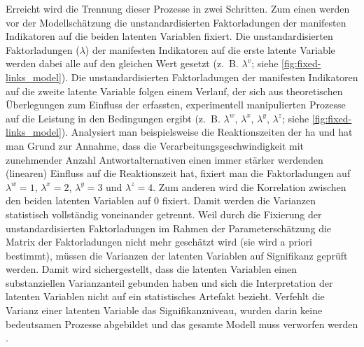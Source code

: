 \documentclass[11pt, twoside, a4paper]{book}		%
\begin{document}
Erreicht wird die Trennung dieser Prozesse in zwei Schritten. Zum einen werden vor der Modellschätzung die unstandardisierten Faktorladungen der manifesten Indikatoren auf die beiden latenten Variablen fixiert. Die unstandardisierten Faktorladungen ($\lambda$) der manifesten Indikatoren auf die erste latente Variable werden dabei alle auf den gleichen Wert gesetzt (z.~B. $\lambda^{v}$; siehe \autoref{fig:fixed-links_model}). 
Die unstandardisierten Faktorladungen der manifesten Indikatoren auf die zweite latente Variable folgen einem Verlauf, der sich aus theoretischen Überlegungen zum Einfluss der erfassten, experimentell manipulierten Prozesse auf die Leistung in den Bedingungen ergibt (z.~B. $\lambda^{w}$, $\lambda^{x}$, $\lambda^{y}$, $\lambda^{z}$; siehe \autoref{fig:fixed-links_model}). Analysiert man beispielsweise die Reaktionszeiten der \gls{ha} und hat man Grund zur Annahme, dass die Verarbeitungsgeschwindigkeit mit zunehmender Anzahl Antwortalternativen einen immer stärker werdenden (linearen) Einfluss auf die Reaktionszeit hat, fixiert man die Faktorladungen auf $\lambda^{w}=1$, $\lambda^{x}=2$, $\lambda^{y}=3$ und $\lambda^{z}=4$. 
Zum anderen wird die Korrelation zwischen den beiden latenten Variablen auf $0$ fixiert. Damit werden die Varianzen statistisch vollständig voneinander getrennt.
Weil durch die Fixierung der unstandardisierten Faktorladungen im Rahmen der Parameterschätzung die Matrix der Faktorladungen nicht mehr geschätzt wird (sie wird a priori bestimmt), müssen die Varianzen der latenten Variablen auf Signifikanz geprüft werden. 
Damit wird sichergestellt, dass die latenten Variablen einen substanziellen Varianzanteil gebunden haben und sich die Interpretation der latenten Variablen nicht auf ein statistisches Artefakt bezieht. Verfehlt die Varianz einer latenten Variable das Signifikanzniveau, wurden darin keine bedeutsamen Prozesse abgebildet und das gesamte Modell muss verworfen werden \citep[für eine ausführliche Beschreibung der Modellierungstechnik siehe z.~B.][]{Schweizer2006a}.
\end{document}
